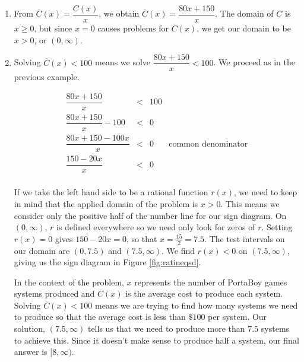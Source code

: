 {
\begin{enumerate}

\item  From $\overline{C}(x) = \dfrac{C(x)}{x}$, we obtain $\overline{C}(x) = \dfrac{80x+150}{x}$.  The domain of $C$ is $x \geq 0$, but since $x=0$ causes problems for $\overline{C}(x)$, we get our domain to be $x>0$, or $(0, \infty)$.

\item  Solving $\overline{C}(x) < 100$ means we solve $\dfrac{80x+150}{x} < 100$.  We proceed as in the previous example.

\[ \begin{array}{rclr}

\dfrac{80x+150}{x} & < & 100 & \\ [10pt]

\dfrac{80x+150}{x} - 100 & < & 0 & \\ [10pt]

\dfrac{80x + 150 - 100x}{x} & < & 0 & \mbox{common denominator} \\ [10pt]

\dfrac{150 - 20x}{x} & < & 0 & \\

\end{array} \]

If we take the left hand side to be a rational function $r(x)$, we need to keep in mind that the applied domain of the problem is $x > 0$.  This means we consider only the positive half of the number line for our sign diagram.  On $(0, \infty)$, $r$ is defined everywhere so we need only look for zeros of $r$.  Setting $r(x)=0$ gives $150-20x =0$, so that $x = \frac{15}{2}= 7.5$.  The test intervals on our domain are $(0, 7.5)$ and $(7.5, \infty)$.  We find $r(x) < 0$ on $(7.5, \infty)$, giving us the sign diagram in Figure \ref{fig:ratineqsd}.



In the context of the problem, $x$ represents the number of PortaBoy games systems produced and $\overline{C}(x)$ is the average cost to produce each system.  Solving $\overline{C}(x) < 100$ means we are trying to find how many systems we need to produce so that the average cost is less than $\$100$ per system.  Our solution, $(7.5, \infty)$ tells us that we need to produce more than $7.5$ systems to achieve this.  Since it doesn't make sense to produce half a system, our final answer is $[8, \infty)$.


\end{enumerate}}
